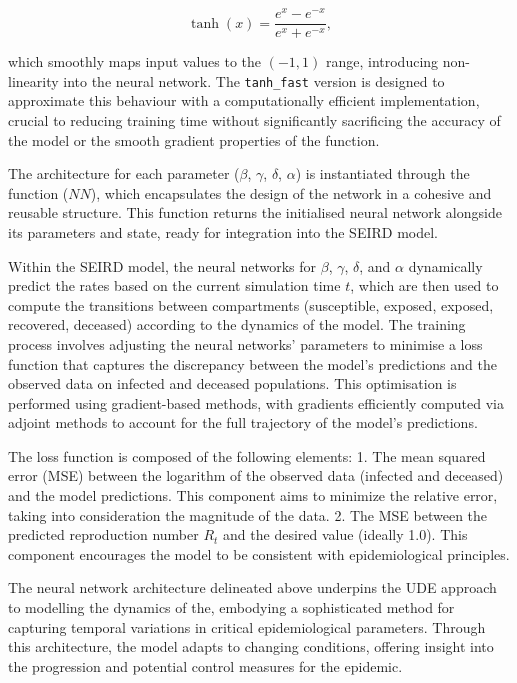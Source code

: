 \documentclass[12pt]{article}
\begin{document}
\begin{equation}
    \tanh(x) = \frac{e^{x} - e^{-x}}{e^{x} + e^{-x}},
\end{equation}

which smoothly maps input values to the \((-1, 1)\) range, introducing non-linearity into the neural network. The \texttt{tanh\_fast} version is designed to approximate this behaviour with a computationally efficient implementation, crucial to reducing training time without significantly sacrificing the accuracy of the model or the smooth gradient properties of the function.

The architecture for each parameter (\(\beta\), \(\gamma\), \(\delta\), \(\alpha\)) is instantiated through the function (\(NN\)), which encapsulates the design of the network in a cohesive and reusable structure. This function returns the initialised neural network alongside its parameters and state, ready for integration into the SEIRD model.

Within the SEIRD model, the neural networks for \(\beta\), \(\gamma\), \(\delta\), and \(\alpha\) dynamically predict the rates based on the current simulation time \(t\), which are then used to compute the transitions between compartments (susceptible, exposed, exposed, recovered, deceased) according to the dynamics of the model. The training process involves adjusting the neural networks' parameters to minimise a loss function that captures the discrepancy between the model's predictions and the observed data on infected and deceased populations. This optimisation is performed using gradient-based methods, with gradients efficiently computed via adjoint methods to account for the full trajectory of the model's predictions.

The loss function is composed of the following elements: 1. The mean squared error (MSE) between the logarithm of the observed data (infected and deceased) and the model predictions. This component aims to minimize the relative error, taking into consideration the magnitude of the data. 2. The MSE between the predicted reproduction number \(R_t\) and the desired value (ideally 1.0). This component encourages the model to be consistent with epidemiological principles.

The neural network architecture delineated above underpins the UDE approach to modelling the dynamics of the, embodying a sophisticated method for capturing temporal variations in critical epidemiological parameters. Through this architecture, the model adapts to changing conditions, offering insight into the progression and potential control measures for the epidemic.
\end{document}
